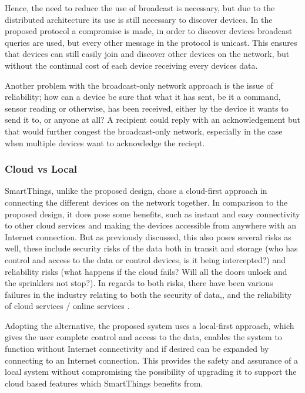Hence, the need to reduce the use of broadcast is necessary, but due to the distributed architecture its use is still necessary to discover devices. In the proposed protocol a compromise is made, in order to discover devices broadcast queries are used, but every other message in the protocol is unicast. This ensures that devices can still easily join and discover other devices on the network, but without the continual cost of each device receiving every devices data.

Another problem with the broadcast-only network approach is the issue of reliability; how can a device be sure that what it has sent, be it a command, sensor reading or otherwise, has been received, either by the device it wants to send it to, or anyone at all? A recipient could reply with an acknowledgement but that would further congest the broadcast-only network, especially in the case when multiple devices want to acknowledge the reciept.


\subsubsection{Cloud vs Local} %
\label{ssub:cloud_vs_local}
SmartThings, unlike the proposed design, chose a cloud-first approach in connecting the different devices on the network together. In comparison to the proposed design, it does pose some benefits, such as instant and easy connectivity to other cloud services and making the devices accessible from anywhere with an Internet connection. But as previously discussed, this also poses several risks as well, these include security risks of the data both in transit and storage (who has control and access to the data or control devices, is it being intercepted?) and reliability risks (what happens if the cloud fails? Will all the doors unlock and the sprinklers not stop?). In regards to both risks, there have been various failures in the industry relating to both the security of data,\cite{Playstation}, and the reliability of cloud services / online services \cite{Amazon, Google}. 

Adopting the alternative, the proposed system uses a local-first approach, which gives the user complete control and access to the data, enables the system to function without Internet connectivity and if desired can be expanded by connecting to an Internet connection. This provides the safety and assurance of a local system without compromising the possibility of upgrading it to support the cloud based features which SmartThings benefits from.

